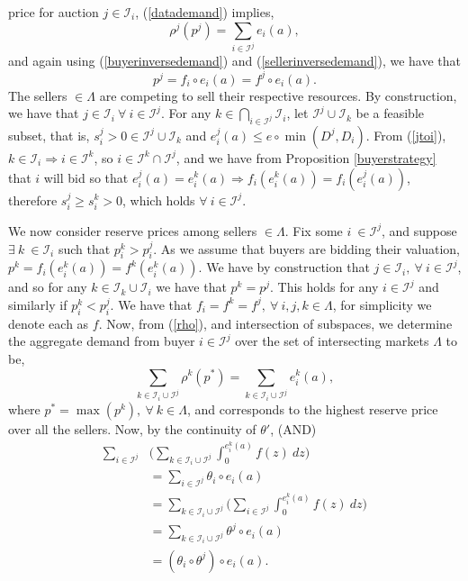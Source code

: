 \documentclass[12pt]{article}
\theoremstyle{definition}
\newcommand{\mcI}{\mathcal{I}}
\begin{document}
\begin{multicols}{2}
price for auction $j\in \mcI_i$,
(\ref{datademand}) implies,
\begin{equation}\label{rho}
    \rho^j(p^j) = \displaystyle\sum_{i\in\mcI^j} e_i(a),
\end{equation}
and again using (\ref{buyerinversedemand}) and
(\ref{sellerinversedemand}), we have that 
\begin{equation}\label{pj}
p^j = f_i\circ e_i(a) = f^j\circ e_i(a).
\end{equation}
The sellers $\in\Lambda$ are competing to sell
their respective resources. By construction, we have that $j\in \mcI_i \
\forall \ i\in \mcI^j$. 
For any $k\in \bigcap_{i\in\mcI^j}\mcI_i$, let $\mcI^j \cup \mcI_k$ be a
feasible subset, that is, $s_i^j > 0 \in \mcI^j \cup \mcI_k$ and $e_i^j(a) \le
e \circ \min(D^j, D_i)$. From (\ref{jtoi}), $k\in\mcI_i \Rightarrow
i\in \mcI^k$, so $i\in \mcI^k \cap \mcI^j$, and we have from Proposition
\ref{buyerstrategy} that $i$ will
bid so that $e_i^j(a) = e_i^k(a) \Rightarrow
f_i(e_i^k(a)) = f_i(e_i^j(a))$, therefore $s_i^j\ge s_i^k > 0$, which holds $\forall \ i\in
\mcI^j$. 

We now consider reserve prices among sellers $\in\Lambda$. Fix some $i \ \in\mcI^j$, and suppose
$\exists \ k \ \in\mcI_{i}$ such that $p_{i}^k > p_{i}^j$. As we assume that
buyers are bidding their valuation, $p^k = f_i(e_i^k(a)) = f^k(e_i^k(a))$. 
We have by construction that $j\in\mcI_i, \ \forall \ i\in\mcI^j$, and so for
any $k \in\mcI_k \cup \mcI_i$ we have that $p^k = p^j$. This holds for any $i\in\mcI^j$ and similarly if $p_i^k <
p_i^j$. 
We have that $f_i=f^k=f^j, \ \forall \ i,j,k \in \Lambda$, for simplicity we
denote each as $f$.
Now, from (\ref{rho}), and intersection of subspaces, we determine the aggregate demand from buyer
$i\in\mcI^j$ over the set of intersecting markets $\Lambda$ to be, 
\begin{equation}\label{sumrho}
    \displaystyle\sum_{k\in\mcI_i\cup\mcI^j}\rho^k(p^*) =
\sum_{k\in\mcI_i\cup\mcI^j}
e_i^k(a),
\end{equation}
where $p^* = \max(p^k), \ \forall \ k \in\Lambda$, and corresponds to the
highest reserve price over all the sellers. 
Now, by the continuity of $\theta'$, (AND)
\begin{align*}
     \displaystyle\sum_{i\in\mcI^j} &\bigg(\sum_{k\in\mcI_i\cup\mcI^j}\int_0^{e_i^k(a)}
f(z) \ dz\bigg)\\
     &=\displaystyle\sum_{i\in\mcI^j} \theta_i \circ e_i(a) \\
     &= \sum_{k\in\mcI_i\cup\mcI^j}\bigg(\sum_{i\in\mcI^j}\int_0^{e_i^k(a)}
f(z) \ dz\bigg)\\
     &= \sum_{k\in\mcI_i\cup\mcI^j}\theta^j \circ e_i(a)\\
     &= (\theta_i \circ \theta^j) \circ e_i(a).
\end{align*}



\end{multicols}
\end{document}
